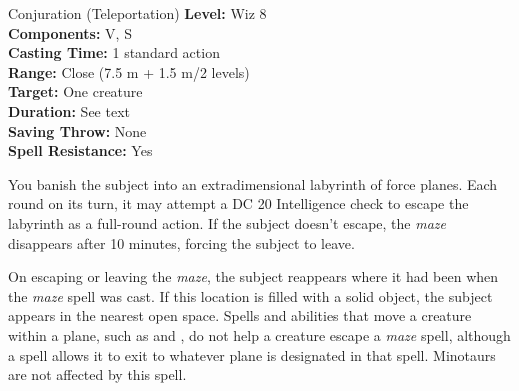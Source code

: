 {Conjuration (Teleportation)}
{
	\textbf{Level:}
	Wiz 8\\
	\textbf{Components:}
	V, S\\
	\textbf{Casting Time:}
	1 standard action\\
	\textbf{Range:}
	Close (7.5 m + 1.5 m/2 levels)\\
	\textbf{Target:}
	One creature\\
	\textbf{Duration:}
	See text\\
	\textbf{Saving Throw:}
	None\\
	\textbf{Spell Resistance:}
	Yes\\
}
{
	You banish the subject into an extradimensional labyrinth of force planes. Each round on its turn, it may attempt a DC 20 Intelligence check to escape the labyrinth as a full-round action. If the subject doesn't escape, the \emph{maze} disappears after 10 minutes, forcing the subject to leave.

	On escaping or leaving the \emph{maze}, the subject reappears where it had been when the \emph{maze} spell was cast. If this location is filled with a solid object, the subject appears in the nearest open space. Spells and abilities that move a creature within a plane, such as  and , do not help a creature escape a \emph{maze} spell, although a  spell allows it to exit to whatever plane is designated in that spell. Minotaurs are not affected by this spell.

}
